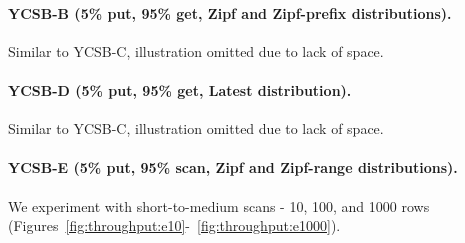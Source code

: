 \paragraph{YCSB-B (5\% put, 95\% get, Zipf and Zipf-prefix distributions).} Similar to YCSB-C, illustration omitted due to 
lack of space. 

\paragraph{YCSB-D (5\% put, 95\% get, Latest distribution).} Similar to YCSB-C, illustration omitted due to lack of space. 

\paragraph{YCSB-E (5\% put, 95\% scan, Zipf and Zipf-range distributions).}
We experiment with short-to-medium scans - 10, 100, and 1000 rows (Figures~\ref{fig:throughput:e10}-~\ref{fig:throughput:e1000}). 

